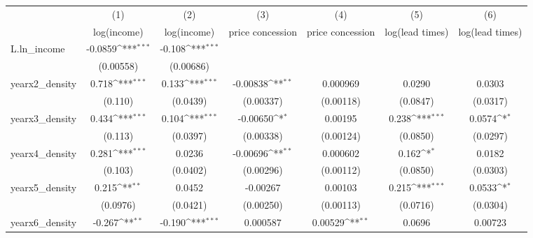 {
\def\sym#1{\ifmmode^{#1}\else\(^{#1}\)\fi}
\begin{tabular}{l*{6}{c}}
\toprule
            &\multicolumn{1}{c}{(1)}&\multicolumn{1}{c}{(2)}&\multicolumn{1}{c}{(3)}&\multicolumn{1}{c}{(4)}&\multicolumn{1}{c}{(5)}&\multicolumn{1}{c}{(6)}\\
            &\multicolumn{1}{c}{log(income)}&\multicolumn{1}{c}{log(income)}&\multicolumn{1}{c}{price concession}&\multicolumn{1}{c}{price concession}&\multicolumn{1}{c}{log(lead times)}&\multicolumn{1}{c}{log(lead times)}\\
\midrule
L.ln\_income &     -0.0859\sym{***}&      -0.108\sym{***}&                     &                     &                     &                     \\
            &   (0.00558)         &   (0.00686)         &                     &                     &                     &                     \\
\addlinespace
yearx2\_density&       0.718\sym{***}&       0.133\sym{***}&    -0.00838\sym{**} &    0.000969         &      0.0290         &      0.0303         \\
            &     (0.110)         &    (0.0439)         &   (0.00337)         &   (0.00118)         &    (0.0847)         &    (0.0317)         \\
\addlinespace
yearx3\_density&       0.434\sym{***}&       0.104\sym{***}&    -0.00650\sym{*}  &     0.00195         &       0.238\sym{***}&      0.0574\sym{*}  \\
            &     (0.113)         &    (0.0397)         &   (0.00338)         &   (0.00124)         &    (0.0850)         &    (0.0297)         \\
\addlinespace
yearx4\_density&       0.281\sym{***}&      0.0236         &    -0.00696\sym{**} &    0.000602         &       0.162\sym{*}  &      0.0182         \\
            &     (0.103)         &    (0.0402)         &   (0.00296)         &   (0.00112)         &    (0.0850)         &    (0.0303)         \\
\addlinespace
yearx5\_density&       0.215\sym{**} &      0.0452         &    -0.00267         &     0.00103         &       0.215\sym{***}&      0.0533\sym{*}  \\
            &    (0.0976)         &    (0.0421)         &   (0.00250)         &   (0.00113)         &    (0.0716)         &    (0.0304)         \\
\addlinespace
yearx6\_density&      -0.267\sym{**} &      -0.190\sym{***}&    0.000587         &     0.00529\sym{**} &      0.0696         &     0.00723         \\

\end{tabular}}
